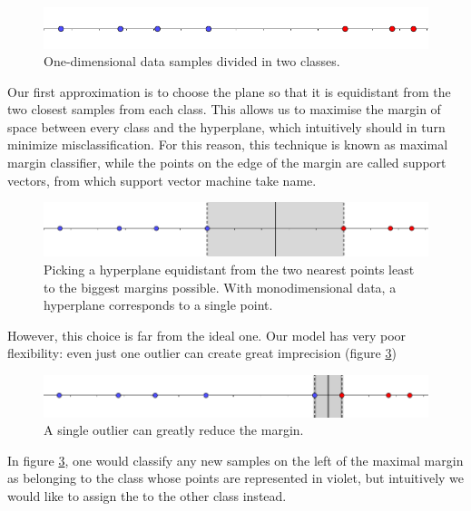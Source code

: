\documentclass[a4paper]{report}
\begin{document}
\begin{figure} [H]
    \centering
    \includegraphics [width=\textwidth ]{svm/1dim.png}
    \caption{One-dimensional data samples divided in two classes.}
    \label{1dim}
\end{figure}


Our first approximation is to choose the plane so that it is equidistant from the two closest samples from each class.
This allows us to maximise the margin of space between every class and the hyperplane, which intuitively should in turn minimize misclassification.
For this reason, this technique is known as maximal margin classifier, while the points on the edge of the margin are called support vectors, from which support vector machine take name.

\begin{figure} [H]
    \centering
    \includegraphics [width=\textwidth ]{svm/1dim_disq.png}
    \caption{Picking a hyperplane equidistant from the two nearest points least to the biggest margins possible. With monodimensional data, a hyperplane corresponds to a single point.}
    \label{1dim1_disq}
\end{figure}

However, this choice is far from the ideal one.
Our model has very poor flexibility:
even just one outlier can create great imprecision (figure \ref{1dim_disq2})


\begin{figure} [H]
    \centering
    \includegraphics [width=\textwidth ]{svm/1dim_disq2.png}
    \caption{A single outlier can greatly reduce the margin.}
    \label{1dim_disq2}
\end{figure}

In figure \ref{1dim_disq2}, one would classify any new samples on the left of the maximal margin as belonging to the class whose points are represented in violet, but intuitively we would like to assign the to the other class instead.
\end{document}
